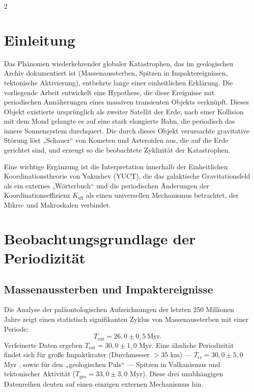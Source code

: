 \documentclass[11pt,a4paper]{article}
\begin{document}
	\begin{multicols}{2}
		
		\section{Einleitung}
		
		Das Phänomen wiederkehrender globaler Katastrophen, das im geologischen Archiv dokumentiert ist (Massenaussterben, Spitzen in Impaktereignissen, tektonische Aktivierung), entbehrte lange einer einheitlichen Erklärung. Die vorliegende Arbeit entwickelt eine Hypothese, die diese Ereignisse mit periodischen Annäherungen eines massiven transienten Objekts verknüpft. Dieses Objekt existierte ursprünglich als zweiter Satellit der Erde; nach einer Kollision mit dem Mond gelangte es auf eine stark elongierte Bahn, die periodisch das innere Sonnensystem durchquert. Die durch dieses Objekt verursachte gravitative Störung löst „Schauer“ von Kometen und Asteroiden aus, die auf die Erde gerichtet sind, und erzeugt so die beobachtete Zyklizität der Katastrophen.
		
		Eine wichtige Ergänzung ist die Interpretation innerhalb der Einheitlichen Koordinationstheorie von Yakushev (YUCT), die das galaktische Gravitationsfeld als ein externes „Wörterbuch“ und die periodischen Änderungen der Koordinationseffizienz \(K_{\mathrm{eff}}\) als einen universellen Mechanismus betrachtet, der Mikro- und Makroskalen verbindet.
		
		\section{Beobachtungsgrundlage der Periodizität}
		
		\subsection{Massenaussterben und Impaktereignisse}
		
		Die Analyse der paläontologischen Aufzeichnungen der letzten 250 Millionen Jahre \cite{Raup1984, Melott2010} zeigt einen statistisch signifikanten Zyklus von Massenaussterben mit einer Periode:
		\[
		T_{\text{ext}} = 26,0 \pm 0,5\ \text{Myr}.
		\]
		Verfeinerte Daten ergeben \(T_{\text{ext}} = 30,0 \pm 1,0\) Myr. Eine ähnliche Periodizität findet sich für große Impaktkrater (Durchmesser \(>35\) km) — \(T_{\text{cr}} = 30,0 \pm 5,0\) Myr \cite{RampinoStothers1984}, sowie für den „geologischen Puls“ — Spitzen in Vulkanismus und tektonischer Aktivität (\(T_{\text{geo}} = 33,0 \pm 3,0\) Myr). Diese drei unabhängigen Datenreihen deuten auf einen einzigen externen Mechanismus hin.
		

\end{multicols}
\end{document}
